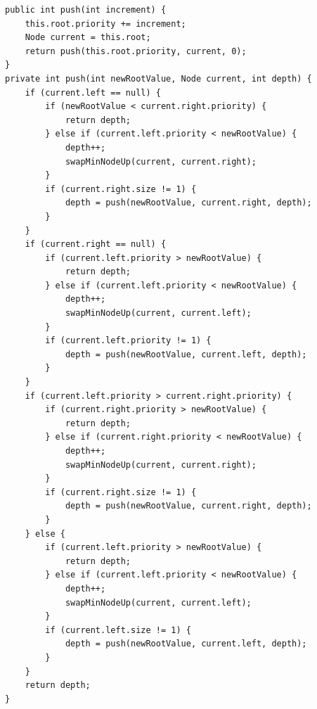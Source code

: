 \documentclass[a4paper,11pt]{article}
\newenvironment{code}{\captionsetup{type=listing}}{}
\begin{document}
\begin{code}
    \label{code:TreePush}
    \begin{verbatim}
public int push(int increment) {
    this.root.priority += increment;
    Node current = this.root;
    return push(this.root.priority, current, 0);
} 
private int push(int newRootValue, Node current, int depth) {
    if (current.left == null) {
        if (newRootValue < current.right.priority) {
            return depth;
        } else if (current.left.priority < newRootValue) {
            depth++;
            swapMinNodeUp(current, current.right);
        }
        if (current.right.size != 1) {
            depth = push(newRootValue, current.right, depth);
        }
    }
    if (current.right == null) {
        if (current.left.priority > newRootValue) {
            return depth;
        } else if (current.left.priority < newRootValue) {
            depth++;
            swapMinNodeUp(current, current.left);
        }
        if (current.left.priority != 1) {
            depth = push(newRootValue, current.left, depth);
        }
    }
    if (current.left.priority > current.right.priority) {
        if (current.right.priority > newRootValue) {
            return depth;
        } else if (current.right.priority < newRootValue) {
            depth++;
            swapMinNodeUp(current, current.right);
        }
        if (current.right.size != 1) {
            depth = push(newRootValue, current.right, depth);
        }
    } else {
        if (current.left.priority > newRootValue) {
            return depth;
        } else if (current.left.priority < newRootValue) {
            depth++;
            swapMinNodeUp(current, current.left);
        }
        if (current.left.size != 1) {
            depth = push(newRootValue, current.left, depth);
        }
    }
    return depth;
}
    \end{verbatim}
\end{code}
\end{document}

